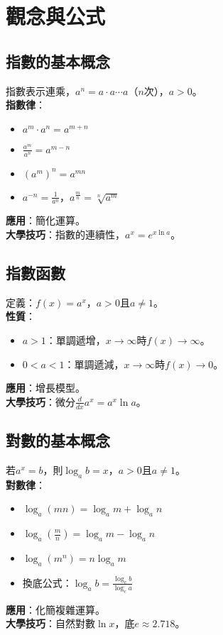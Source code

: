 

\section{觀念與公式}

\subsection{指數的基本概念}
指數表示連乘，$a^n = a \cdot a \cdots a$（$n$次），$a > 0$。\\
\textbf{指數律}：
\begin{itemize}
    \item $a^m \cdot a^n = a^{m+n}$
    \item $\frac{a^m}{a^n} = a^{m-n}$
    \item $(a^m)^n = a^{mn}$
    \item $a^{-n} = \frac{1}{a^n}$，$a^{\frac{m}{n}} = \sqrt[n]{a^m}$
\end{itemize}
\textbf{應用}：簡化運算。\\
\textbf{大學技巧}：指數的連續性，$a^x = e^{x \ln a}$。

\subsection{指數函數}
定義：$f(x) = a^x$，$a > 0$且$a \neq 1$。\\
\textbf{性質}：
\begin{itemize}
    \item $a > 1$：單調遞增，$x \to \infty$時$f(x) \to \infty$。
    \item $0 < a < 1$：單調遞減，$x \to \infty$時$f(x) \to 0$。
\end{itemize}
\textbf{應用}：增長模型。\\
\textbf{大學技巧}：微分$\frac{d}{dx} a^x = a^x \ln a$。

\subsection{對數的基本概念}
若$a^x = b$，則$\log_a b = x$，$a > 0$且$a \neq 1$。\\
\textbf{對數律}：
\begin{itemize}
    \item $\log_a (mn) = \log_a m + \log_a n$
    \item $\log_a \left(\frac{m}{n}\right) = \log_a m - \log_a n$
    \item $\log_a (m^n) = n \log_a m$
    \item 換底公式：$\log_a b = \frac{\log_c b}{\log_c a}$
\end{itemize}
\textbf{應用}：化簡複雜運算。\\
\textbf{大學技巧}：自然對數$\ln x$，底$e \approx 2.718$。

